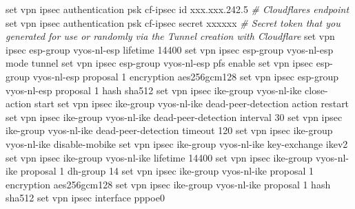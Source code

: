 \documentclass[
]{article}
\newenvironment{Shaded}{\begin{snugshade}}{\end{snugshade}}
\newcommand{\BuiltInTok}[1]{#1}
\newcommand{\CommentTok}[1]{\textcolor[rgb]{0.56,0.35,0.01}{\textit{#1}}}
\newcommand{\NormalTok}[1]{#1}
\newcommand{\StringTok}[1]{\textcolor[rgb]{0.31,0.60,0.02}{#1}}
\begin{document}
\begin{Shaded}
\begin{Highlighting}[numbers=left,,]
\BuiltInTok{set}\NormalTok{ vpn ipsec authentication psk cf{-}ipsec id }\StringTok{\textquotesingle{}xxx.xxx.242.5\textquotesingle{}} \CommentTok{\# Cloudflare\textquotesingle{}s endpoint}
\BuiltInTok{set}\NormalTok{ vpn ipsec authentication psk cf{-}ipsec secret xxxxxx }\CommentTok{\# Secret token that you generated for use or randomly via the Tunnel creation with Cloudflare}
\BuiltInTok{set}\NormalTok{ vpn ipsec esp{-}group vyos{-}nl{-}esp lifetime }\StringTok{\textquotesingle{}14400\textquotesingle{}}
\BuiltInTok{set}\NormalTok{ vpn ipsec esp{-}group vyos{-}nl{-}esp mode }\StringTok{\textquotesingle{}tunnel\textquotesingle{}}
\BuiltInTok{set}\NormalTok{ vpn ipsec esp{-}group vyos{-}nl{-}esp pfs }\StringTok{\textquotesingle{}enable\textquotesingle{}}
\BuiltInTok{set}\NormalTok{ vpn ipsec esp{-}group vyos{-}nl{-}esp proposal 1 encryption }\StringTok{\textquotesingle{}aes256gcm128\textquotesingle{}}
\BuiltInTok{set}\NormalTok{ vpn ipsec esp{-}group vyos{-}nl{-}esp proposal 1 hash }\StringTok{\textquotesingle{}sha512\textquotesingle{}}
\BuiltInTok{set}\NormalTok{ vpn ipsec ike{-}group vyos{-}nl{-}ike close{-}action }\StringTok{\textquotesingle{}start\textquotesingle{}}
\BuiltInTok{set}\NormalTok{ vpn ipsec ike{-}group vyos{-}nl{-}ike dead{-}peer{-}detection action }\StringTok{\textquotesingle{}restart\textquotesingle{}}
\BuiltInTok{set}\NormalTok{ vpn ipsec ike{-}group vyos{-}nl{-}ike dead{-}peer{-}detection interval }\StringTok{\textquotesingle{}30\textquotesingle{}}
\BuiltInTok{set}\NormalTok{ vpn ipsec ike{-}group vyos{-}nl{-}ike dead{-}peer{-}detection timeout }\StringTok{\textquotesingle{}120\textquotesingle{}}
\BuiltInTok{set}\NormalTok{ vpn ipsec ike{-}group vyos{-}nl{-}ike disable{-}mobike}
\BuiltInTok{set}\NormalTok{ vpn ipsec ike{-}group vyos{-}nl{-}ike key{-}exchange }\StringTok{\textquotesingle{}ikev2\textquotesingle{}}
\BuiltInTok{set}\NormalTok{ vpn ipsec ike{-}group vyos{-}nl{-}ike lifetime }\StringTok{\textquotesingle{}14400\textquotesingle{}}
\BuiltInTok{set}\NormalTok{ vpn ipsec ike{-}group vyos{-}nl{-}ike proposal 1 dh{-}group }\StringTok{\textquotesingle{}14\textquotesingle{}}
\BuiltInTok{set}\NormalTok{ vpn ipsec ike{-}group vyos{-}nl{-}ike proposal 1 encryption }\StringTok{\textquotesingle{}aes256gcm128\textquotesingle{}}
\BuiltInTok{set}\NormalTok{ vpn ipsec ike{-}group vyos{-}nl{-}ike proposal 1 hash }\StringTok{\textquotesingle{}sha512\textquotesingle{}}
\BuiltInTok{set}\NormalTok{ vpn ipsec interface }\StringTok{\textquotesingle{}pppoe0\textquotesingle{}}

\end{Highlighting}
\end{Shaded}
\end{document}
